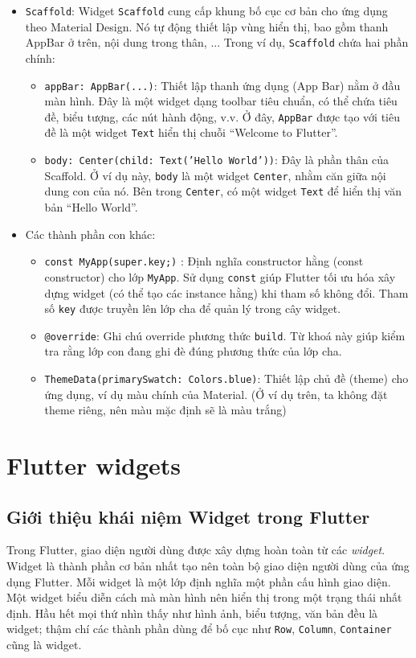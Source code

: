 \documentclass[../DoAn.tex]{subfiles}
\numberwithin{figure}{chapter}
\begin{document}
\begin{itemize}
\item \texttt{Scaffold}: Widget \texttt{Scaffold} cung cấp khung bố cục cơ bản cho ứng dụng theo Material Design. Nó tự động thiết lập vùng hiển thị, bao gồm thanh AppBar ở trên, nội dung trong thân, ... Trong ví dụ, \texttt{Scaffold} chứa hai phần chính: 
\begin{itemize} 
\item \texttt{appBar: AppBar(...)}: Thiết lập thanh ứng dụng (App Bar) nằm ở đầu màn hình. Đây là một widget dạng toolbar tiêu chuẩn, có thể chứa tiêu đề, biểu tượng, các nút hành động, v.v. Ở đây, \texttt{AppBar} được tạo với tiêu đề là một widget \texttt{Text} hiển thị chuỗi “Welcome to Flutter”. 
\item \texttt{body: Center(child: Text('Hello World'))}: Đây là phần thân của Scaffold. Ở ví dụ này, \texttt{body} là một widget \texttt{Center}, nhằm căn giữa nội dung con của nó. Bên trong \texttt{Center}, có một widget \texttt{Text} để hiển thị văn bản “Hello World”.
\end{itemize}

\item Các thành phần con khác: 
\begin{itemize} 
\item \texttt{const MyApp({super.key};)} : Định nghĩa constructor hằng (const constructor) cho lớp \texttt{MyApp}. Sử dụng \texttt{const} giúp Flutter tối ưu hóa xây dựng widget (có thể tạo các instance hằng) khi tham số không đổi. Tham số \texttt{key} được truyền lên lớp cha để quản lý trong cây widget. \item \texttt{@override}: Ghi chú override phương thức \texttt{build}. Từ khoá này giúp kiểm tra rằng lớp con đang ghi đè đúng phương thức của lớp cha. 
\item \texttt{ThemeData(primarySwatch: Colors.blue)}: Thiết lập chủ đề (theme) cho ứng dụng, ví dụ màu chính của Material. (Ở ví dụ trên, ta không đặt theme riêng, nên màu mặc định sẽ là màu trắng)
\end{itemize}
\end{itemize}

\section{Flutter widgets}
\subsection{Giới thiệu khái niệm Widget trong Flutter}
Trong Flutter, giao diện người dùng được xây dựng hoàn toàn từ các \textit{widget}. Widget là thành phần cơ bản nhất tạo nên toàn bộ giao diện người dùng của ứng dụng Flutter. Mỗi widget là một lớp định nghĩa một phần cấu hình giao diện. Một widget biểu diễn cách mà màn hình nên hiển thị trong một trạng thái nhất định. Hầu hết mọi thứ nhìn thấy như hình ảnh, biểu tượng, văn bản đều là widget; thậm chí các thành phần dùng để bố cục như \texttt{Row}, \texttt{Column}, \texttt{Container} cũng là widget.
\end{document}
